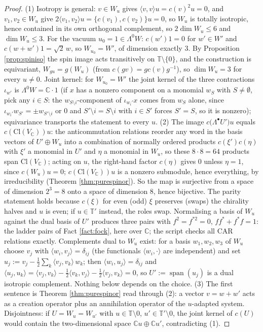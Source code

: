 \documentclass[11pt]{article}
\theoremstyle{definition}
\newcommand{\Cl}{\mathrm{Cl}}
\newcommand{\C}{\mathbb{C}}
\newcommand{\T}{\mathbb{T}}
\newcommand{\ip}[2]{\langle #1, #2\rangle}
\begin{document}
\begin{proof}
(1) Isotropy is general: $v \in W_u$ gives $\ip{v}{v}u = c(v)^2u = 0$, and $v_1, v_2 \in W_u$ give $2\ip{v_1}{v_2}u = \{c(v_1), c(v_2)\}u = 0$, so $W_u$ is totally isotropic, hence contained in its own orthogonal complement, so $2\dim W_u \le 6$ and $\dim W_u \le 3$. For the vacuum $u_0 = 1 \in \Lambda^0 W$: $c(w')1 = 0$ for $w' \in W'$ and $c(w+w')1 = \sqrt2\,w$, so $W_{u_0} = W'$, of dimension exactly $3$. By Proposition \ref{prop:spiniso} the spin image acts transitively on $\T\setminus\{0\}$, and the construction is equivariant, $W_{gu} = g(W_u)$ (from $c(gv) = g c(v) g^{-1}$), so $\dim W_u = 3$ for every $u \neq 0$. Joint kernel: for $W_{u_0} = W'$ the joint kernel of the three contractions $\iota_{w'}$ is $\Lambda^0 W = \C\cdot 1$ (if $x$ has a nonzero component on a monomial $w_S$ with $S \neq \emptyset$, pick any $i \in S$: the $w_{S\setminus i}$-component of $\iota_{w_i'}x$ comes from $w_S$ alone, since $\iota_{w_i'}w_{S'} = \pm w_{S'\setminus i}$ or $0$ and $S'\setminus i = S\setminus i$ with $i \in S'$ forces $S' = S$, so it is nonzero); equivariance transports the statement to every $u$.
(2) The image $c\bigl(\Lambda^\bullet U'\bigr)u$ equals $c(\Cl(V_\C))u$: the anticommutation relations reorder any word in the basis vectors of $U' \oplus W_u$ into a combination of normally ordered products $c(\xi')c(\eta)$ with $\xi'$ a monomial in $U'$ and $\eta$ a monomial in $W_u$, so these $8\cdot 8 = 64$ products span $\Cl(V_\C)$; acting on $u$, the right-hand factor $c(\eta)$ gives $0$ unless $\eta = 1$, since $c(W_u)u = 0$; $c(\Cl(V_\C))u$ is a nonzero submodule, hence everything, by irreducibility (Theorem \ref{thm:purespinor}). So the map is surjective from a space of dimension $2^3 = 8$ onto a space of dimension $8$, hence bijective. The parity statement holds because $c(\xi)$ for even (odd) $\xi$ preserves (swaps) the chirality halves and $u$ is even; if $u \in \T'$ instead, the roles swap. Normalising a basis of $W_u$ against the dual basis of $U'$ produces three pairs with $f^2 = f^{*2} = 0$, $ff^* + f^*f = 1$: the ladder pairs of Fact \ref{fact:fock}, here over $\C$; the script checks all CAR relations exactly. Complements dual to $W_u$ exist: for a basis $w_1, w_2, w_3$ of $W_u$ choose $v_j$ with $\ip{w_i}{v_j} = \delta_{ij}$ (the functionals $\ip{w_i}{\cdot}$ are independent) and set $u_j := v_j - \tfrac12\sum_k \ip{v_j}{v_k}\,w_k$; then $\ip{w_i}{u_j} = \delta_{ij}$ and $\ip{u_j}{u_k} = \ip{v_j}{v_k} - \tfrac12\ip{v_k}{v_j} - \tfrac12\ip{v_j}{v_k} = 0$, so $U' := \operatorname{span}(u_j)$ is a dual isotropic complement. Nothing below depends on the choice.
(3) The first sentence is Theorem \ref{thm:purespinor} read through (2): a vector $v = w + w'$ acts as a creation operator plus an annihilation operator of the $u$-adapted system. Disjointness: if $U = W_{u} = W_{u'}$ with $u \in \T\setminus 0$, $u' \in \T'\setminus 0$, the joint kernel of $c(U)$ would contain the two-dimensional space $\C u \oplus \C u'$, contradicting (1).
\end{proof}
\end{document}
